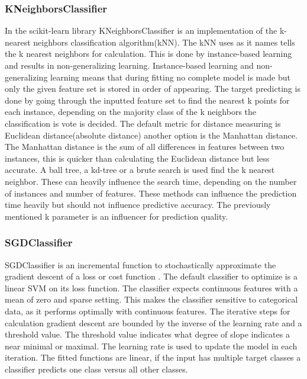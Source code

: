 \documentclass[a4paper,10pt]{article}
\begin{document}
\subsubsection{KNeighborsClassifier}
In the scikit-learn library KNeighborsClassifier is an implementation of the k-nearest neighbors classification algorithm(kNN)\cite{KNN}. The kNN uses as it names tells the k nearest neighbors for calculation. This is done by instance-based learning and results in non-generalizing learning. Instance-based learning and non-generalizing learning means that during fitting no complete model is made but only the given feature set is stored in order of appearing. The target predicting is done by going through the inputted feature set to find the nearest k points for each instance, depending on the majority class of the k neighbors the classification is vote is decided. The default metric for distance measuring is Euclidean distance(absolute distance) another option is the Manhattan distance. The Manhattan distance is the sum of all differences in features between two instances, this is quicker than calculating the Euclidean distance but less accurate. A ball tree, a kd-tree or a brute search is used find the k nearest neighbor. These can heavily influence the search time, depending on the number of instances and number of features. These methods can influence the prediction time heavily but should not influence predictive accuracy. The previously mentioned k parameter is an influencer for prediction quality.\cite{KNN-k}

\subsubsection{SGDClassifier}
SGDClassifier is an incremental function to stochastically approximate the gradient descent of a loss or cost function \cite{SGDClass}. The default classifier to optimize is a linear SVM on its loss function. The classifier expects continuous features with a mean of zero and sparse setting. This makes the classifier sensitive to categorical data, as it performs optimally with continuous features. The iterative steps for calculation gradient descent are bounded by the inverse of the learning rate and a threshold value. The threshold value indicates what degree of slope indicates a near minimal or maximal. The learning rate is used to update the model in each iteration. The fitted functions are linear, if the input has multiple target classes a classifier predicts one class versus all other classes. 
\end{document}
